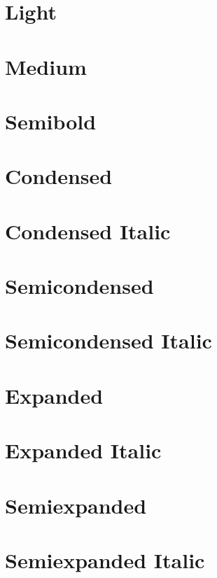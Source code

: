 \documentclass{article}
\begin{document}
\section*{Light}

{\jLight\lipsum[1] }

\section*{Medium}

{\jMedium
\lipsum[2] }

\section*{Semibold}

{\jSmBold\lipsum[3] }

\section*{Condensed}

{\jCond\lipsum[7] }

\section*{Condensed Italic}

{\jCondItalic\lipsum[8]}

\section*{Semicondensed}

{\jSmCond\lipsum[9] }

\section*{Semicondensed Italic}

{\jSmCondItalic\lipsum[9]}

\section*{Expanded}

{\jExp\lipsum[10] }

\section*{Expanded Italic}

{\jExpItalic\lipsum[11]}

\section*{Semiexpanded}

{\jSmExp\lipsum[12] }

\section*{Semiexpanded Italic}

{\jSmExpItalic\lipsum[12]}
\end{document}
